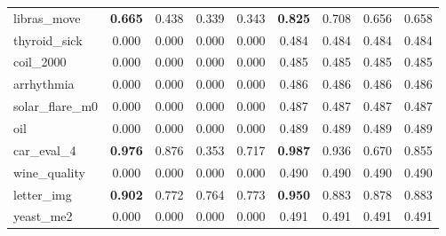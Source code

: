 \begin{figure}[ht]
\begin{tabular}{p{22mm}|*4{p{14mm}}|*4{p{14mm}}}
        libras\_move&\multicolumn{1}{c}{\textbf{0.665}}&\multicolumn{1}{c}{0.438}&\multicolumn{1}{c}{0.339}&\multicolumn{1}{c|}{0.343}&\multicolumn{1}{c}{\textbf{0.825}}&\multicolumn{1}{c}{0.708}&\multicolumn{1}{c}{0.656}&\multicolumn{1}{c}{0.658}\\
        thyroid\_sick&\multicolumn{1}{c}{0.000}&\multicolumn{1}{c}{0.000}&\multicolumn{1}{c}{0.000}&\multicolumn{1}{c|}{0.000}&\multicolumn{1}{c}{0.484}&\multicolumn{1}{c}{0.484}&\multicolumn{1}{c}{0.484}&\multicolumn{1}{c}{0.484}\\
        coil\_2000&\multicolumn{1}{c}{0.000}&\multicolumn{1}{c}{0.000}&\multicolumn{1}{c}{0.000}&\multicolumn{1}{c|}{0.000}&\multicolumn{1}{c}{0.485}&\multicolumn{1}{c}{0.485}&\multicolumn{1}{c}{0.485}&\multicolumn{1}{c}{0.485}\\
        arrhythmia&\multicolumn{1}{c}{0.000}&\multicolumn{1}{c}{0.000}&\multicolumn{1}{c}{0.000}&\multicolumn{1}{c|}{0.000}&\multicolumn{1}{c}{0.486}&\multicolumn{1}{c}{0.486}&\multicolumn{1}{c}{0.486}&\multicolumn{1}{c}{0.486}\\
        solar\_flare\_m0&\multicolumn{1}{c}{0.000}&\multicolumn{1}{c}{0.000}&\multicolumn{1}{c}{0.000}&\multicolumn{1}{c|}{0.000}&\multicolumn{1}{c}{0.487}&\multicolumn{1}{c}{0.487}&\multicolumn{1}{c}{0.487}&\multicolumn{1}{c}{0.487}\\
        oil&\multicolumn{1}{c}{0.000}&\multicolumn{1}{c}{0.000}&\multicolumn{1}{c}{0.000}&\multicolumn{1}{c|}{0.000}&\multicolumn{1}{c}{0.489}&\multicolumn{1}{c}{0.489}&\multicolumn{1}{c}{0.489}&\multicolumn{1}{c}{0.489}\\
        car\_eval\_4&\multicolumn{1}{c}{\textbf{0.976}}&\multicolumn{1}{c}{0.876}&\multicolumn{1}{c}{0.353}&\multicolumn{1}{c|}{0.717}&\multicolumn{1}{c}{\textbf{0.987}}&\multicolumn{1}{c}{0.936}&\multicolumn{1}{c}{0.670}&\multicolumn{1}{c}{0.855}\\
        wine\_quality&\multicolumn{1}{c}{0.000}&\multicolumn{1}{c}{0.000}&\multicolumn{1}{c}{0.000}&\multicolumn{1}{c|}{0.000}&\multicolumn{1}{c}{0.490}&\multicolumn{1}{c}{0.490}&\multicolumn{1}{c}{0.490}&\multicolumn{1}{c}{0.490}\\
        letter\_img&\multicolumn{1}{c}{\textbf{0.902}}&\multicolumn{1}{c}{0.772}&\multicolumn{1}{c}{0.764}&\multicolumn{1}{c|}{0.773}&\multicolumn{1}{c}{\textbf{0.950}}&\multicolumn{1}{c}{0.883}&\multicolumn{1}{c}{0.878}&\multicolumn{1}{c}{0.883}\\
        yeast\_me2&\multicolumn{1}{c}{0.000}&\multicolumn{1}{c}{0.000}&\multicolumn{1}{c}{0.000}&\multicolumn{1}{c|}{0.000}&\multicolumn{1}{c}{0.491}&\multicolumn{1}{c}{0.491}&\multicolumn{1}{c}{0.491}&\multicolumn{1}{c}{0.491}\\

\end{tabular}
\end{figure}
